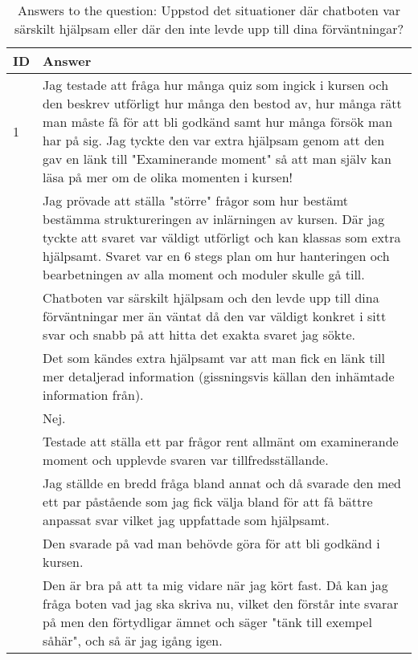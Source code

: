 \begin{table}[h]
\centering
{\small
\begin{tabularx}{\textwidth}{@{}lX@{}}
\toprule
\textbf{ID} & \textbf{Answer} \\ \midrule
1 & Jag testade att fråga hur många quiz som ingick i kursen och den beskrev utförligt hur många den bestod av, hur många rätt man måste få för att bli godkänd samt hur många försök man har på sig. Jag tyckte den var extra hjälpsam genom att den gav en länk till "Examinerande moment" så att man själv kan läsa på mer om de olika momenten i kursen! \\ \hdashline
2 & Jag prövade att ställa "större" frågor som hur bestämt bestämma struktureringen av inlärningen av kursen. Där jag tyckte att svaret var väldigt utförligt och kan klassas som extra hjälpsamt. Svaret var en 6 stegs plan om hur hanteringen och bearbetningen av alla moment och moduler skulle gå till. \\ \hdashline
3 & Chatboten var särskilt hjälpsam och den levde upp till dina förväntningar mer än väntat då den var väldigt konkret i sitt svar och snabb på att hitta det exakta svaret jag sökte. \\ \hdashline
4 & Det som kändes extra hjälpsamt var att man fick en länk till mer detaljerad information (gissningsvis källan den inhämtade information från). \\ \hdashline
5 & Nej. \\ \hdashline
6 & Testade att ställa ett par frågor rent allmänt om examinerande moment och upplevde svaren var tillfredsställande. \\ \hdashline
7 & Jag ställde en bredd fråga bland annat och då svarade den med ett par påstående som jag fick välja bland för att få bättre anpassat svar vilket jag uppfattade som hjälpsamt. \\ \hdashline
8 & Den svarade på vad man behövde göra för att bli godkänd i kursen. \\ \hdashline
9 & Den är bra på att ta mig vidare när jag kört fast. Då kan jag fråga boten vad jag ska skriva nu, vilket den förstår inte svarar på men den förtydligar ämnet och säger "tänk till exempel såhär", och så är jag igång igen. \\
\bottomrule
\end{tabularx}
}
\vspace{2mm}
\caption{Answers to the question: Uppstod det situationer där chatboten var särskilt hjälpsam eller där den inte levde upp till dina förväntningar?}
\label{tab:appendix_typeform_table_question_helpful_or_fell_short}
\end{table}

